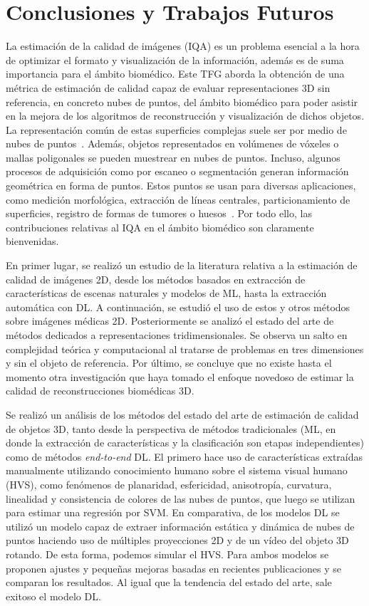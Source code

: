 \chapter{Conclusiones y Trabajos Futuros}
La estimación de la calidad de imágenes (IQA) es un problema esencial a la hora 
de optimizar el formato y visualización de la información, además es de 
suma importancia para el ámbito biomédico. 
Este TFG aborda la obtención de una métrica de estimación de calidad capaz de evaluar 
representaciones 3D sin referencia, en concreto nubes de puntos, del ámbito biomédico para poder asistir 
en la mejora de los algoritmos de reconstrucción y visualización de dichos objetos. 
La representación común de estas superficies complejas 
suele ser por medio de nubes de puntos~\cite{WhyUsePointCloud}. 
Además, objetos representados en volúmenes de vóxeles o mallas poligonales se pueden 
muestrear en nubes de puntos. Incluso, algunos procesos de adquisición como 
por escaneo o segmentación generan información geométrica en forma de puntos. 
Estos puntos se usan para diversas aplicaciones, 
como medición morfológica, extracción de líneas centrales, 
particionamiento de superficies, registro de formas de tumores o huesos~\cite{WhyUsePointCloud}.
Por todo ello, las contribuciones relativas al IQA en el 
ámbito biomédico son claramente bienvenidas.

En primer lugar, se realizó un estudio de la literatura relativa a la estimación de calidad 
de imágenes 2D, desde los métodos basados en extracción de características de escenas naturales y modelos de ML, 
hasta la extracción automática con DL. 
A continuación, se estudió el uso de estos y otros métodos sobre imágenes médicas 2D.
Posteriormente se analizó el estado del arte de métodos dedicados a representaciones tridimensionales. 
Se observa un salto en complejidad teórica y computacional al tratarse de problemas 
en tres dimensiones y sin el objeto de referencia. 
Por último, se concluye que no existe hasta el momento 
otra investigación que haya tomado el enfoque novedoso de estimar la calidad de 
reconstrucciones biomédicas 3D. 

Se realizó un análisis de los métodos del estado del arte de estimación de calidad de objetos 
3D, tanto desde la perspectiva de métodos tradicionales (ML, en donde la extracción 
de características y la clasificación son etapas independientes) como de métodos \emph{end-to-end} DL. El primero hace uso de características 
extraídas manualmente utilizando conocimiento humano sobre el sistema visual humano (HVS), 
como fenómenos de planaridad, esfericidad, anisotropía, curvatura, linealidad y consistencia de 
colores de las nubes de puntos, que luego se utilizan para estimar una regresión por 
SVM. En comparativa, de los modelos DL se utilizó un modelo capaz de extraer 
información estática y dinámica de nubes de puntos haciendo uso de múltiples 
proyecciones 2D y de un vídeo del objeto 3D rotando. De esta forma, podemos  
simular el HVS. Para ambos modelos se proponen ajustes y pequeñas mejoras basadas 
en recientes publicaciones y se comparan los resultados. 
Al igual que la tendencia del estado del arte, sale exitoso el modelo DL. 


